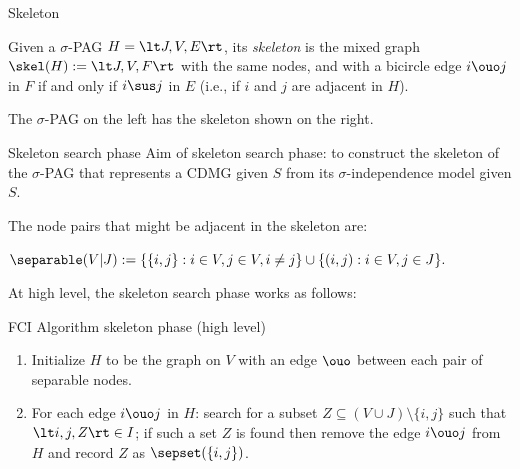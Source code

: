 \begin{frame}{Skeleton}
\begin{Def}[\ref{def:skeleton}]
Given a $\sigma$-PAG $H = \lt J, V, E \rt$, its \emph{skeleton} is the mixed graph 
$\skel(H) := \lt J, V, F \rt$ with the same nodes, and with a bicircle edge $i \ouo j$ in $F$
if and only if $i \sus j$ in $E$ (i.e., if $i$ and $j$ are adjacent in $H$).
\end{Def}
\begin{example}
  The $\sigma$-PAG on the left has the skeleton shown on the right.

  \medskip
  \centerline{}
\end{example}
\end{frame}

\begin{frame}{Skeleton search phase}
Aim of skeleton search phase: to construct the skeleton of the $\sigma$-PAG that represents a CDMG given $S$ from its $\sigma$-independence model given $S$.

\bigskip
The node pairs that might be adjacent in the skeleton are:
\begin{Def}%
  $\separable(V|J) :=  %
  \{ \{i,j\} : i \in V, j \in V, i \ne j \} \cup \{ (i,j) : i \in V, j \in J \}.$
\end{Def}

\bigskip
At high level, the skeleton search phase works as follows:
\begin{block}{FCI Algorithm skeleton phase (high level)}
\begin{enumerate}
  \item Initialize $H$ to be the graph on $V$ with an edge $\ouo$ between each pair of separable nodes.
  \item For each edge $i \ouo j$ in $H$:
    search for a subset $Z \subseteq (V \cup J) \setminus \{i,j\}$ such that $\lt i, j, Z \rt \in I$;
    if such a set $Z$ is found then remove the edge $i \ouo j$ from $H$ and record $Z$ as $\sepset(\{i,j\})$.
\end{enumerate}
\end{block}
\end{frame}

